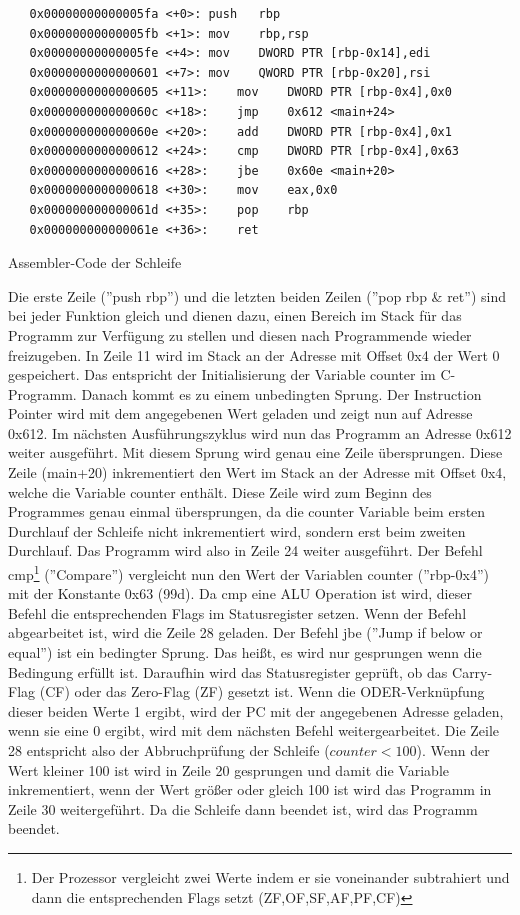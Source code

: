 \documentclass[12pt]{article}
\begin{document}
\begin{code}[!htb]
\begin{lstlisting}
   0x00000000000005fa <+0>:	push   rbp
   0x00000000000005fb <+1>:	mov    rbp,rsp
   0x00000000000005fe <+4>:	mov    DWORD PTR [rbp-0x14],edi
   0x0000000000000601 <+7>:	mov    QWORD PTR [rbp-0x20],rsi
   0x0000000000000605 <+11>:	mov    DWORD PTR [rbp-0x4],0x0
   0x000000000000060c <+18>:	jmp    0x612 <main+24>
   0x000000000000060e <+20>:	add    DWORD PTR [rbp-0x4],0x1
   0x0000000000000612 <+24>:	cmp    DWORD PTR [rbp-0x4],0x63
   0x0000000000000616 <+28>:	jbe    0x60e <main+20>
   0x0000000000000618 <+30>:	mov    eax,0x0
   0x000000000000061d <+35>:	pop    rbp
   0x000000000000061e <+36>:	ret    
\end{lstlisting}
\caption[Assembler Code einfache Schleife]{Assembler-Code der Schleife}
\label{code:scheifeasm}
\end{code}

\noindent Die erste Zeile (''push rbp'') und die letzten beiden Zeilen (''pop rbp \& ret'') sind bei jeder Funktion gleich und dienen dazu, einen Bereich im Stack für das Programm zur Verfügung zu stellen und diesen nach Programmende wieder freizugeben. In Zeile 11 wird im Stack an der Adresse mit Offset 0x4 der Wert 0 gespeichert. Das entspricht der Initialisierung der Variable counter im C-Programm. Danach kommt es zu einem unbedingten Sprung. Der Instruction Pointer wird mit dem angegebenen Wert geladen und zeigt nun auf Adresse 0x612. Im nächsten Ausführungszyklus wird nun das Programm an Adresse 0x612 weiter ausgeführt. Mit diesem Sprung wird genau eine Zeile übersprungen. Diese Zeile (main+20) inkrementiert den Wert im Stack an der Adresse mit Offset 0x4, welche die Variable counter enthält. Diese Zeile wird zum Beginn des Programmes genau einmal übersprungen, da die counter Variable beim ersten Durchlauf der Schleife nicht inkrementiert wird, sondern erst beim zweiten Durchlauf. Das Programm wird also in Zeile 24 weiter ausgeführt. Der Befehl cmp\footnote{Der Prozessor vergleicht zwei Werte indem er sie voneinander subtrahiert und dann die entsprechenden Flags setzt (ZF,OF,SF,AF,PF,CF)\cite[S.176]{intel4000}} (''Compare'') vergleicht nun den Wert der Variablen counter (''rbp-0x4'') mit der Konstante 0x63 (99d). Da cmp eine ALU Operation ist wird, dieser Befehl die entsprechenden Flags im Statusregister setzen. Wenn der Befehl abgearbeitet ist, wird die Zeile 28 geladen. Der Befehl jbe (''Jump if below or equal'') ist ein bedingter Sprung. Das heißt, es wird nur gesprungen wenn die Bedingung erfüllt ist. Daraufhin wird das Statusregister geprüft, ob das Carry-Flag (CF) oder das Zero-Flag (ZF) gesetzt ist. Wenn die ODER-Verknüpfung dieser beiden Werte 1 ergibt, wird der PC mit der angegebenen Adresse geladen, wenn sie eine 0 ergibt, wird mit dem nächsten Befehl weitergearbeitet\cite[S.1060]{intel4000}. Die Zeile 28 entspricht also der Abbruchprüfung der Schleife  ($counter < 100$). Wenn der Wert kleiner 100 ist wird in Zeile 20 gesprungen und damit die Variable inkrementiert, wenn der Wert größer oder gleich 100 ist wird das Programm in Zeile 30 weitergeführt. Da die Schleife dann beendet ist, wird das Programm beendet.
\end{document}
